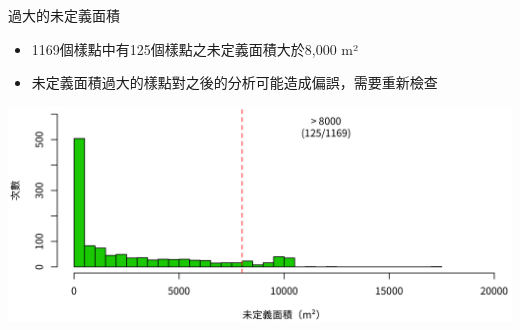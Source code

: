 \documentclass[10pt, aspectratio=1610, xcolor=table]{beamer}
\begin{document}
\begin{frame}{過大的未定義面積}
\begin{itemize}
	\item 1169個樣點中有125個樣點之未定義面積大於8,000 m²
	\item 未定義面積過大的樣點對之後的分析可能造成偏誤，需要重新檢查
\end{itemize}
\begin{center}
\includegraphics[width=1\textwidth]{invalid-gx-area.png}
\end{center}
\end{frame}
\end{document}
